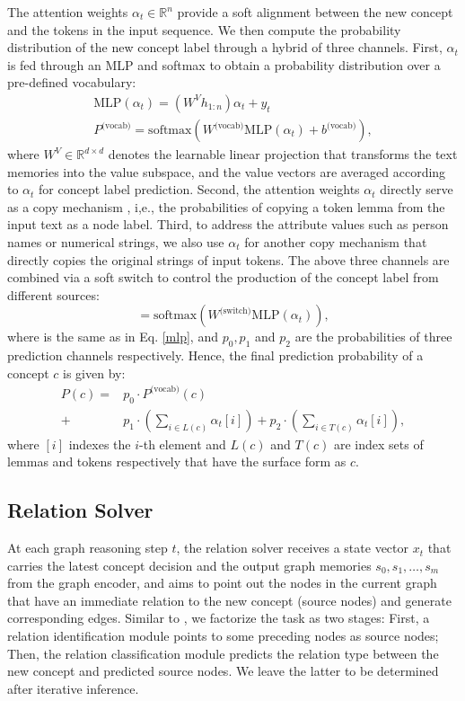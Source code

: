 \documentclass[11pt,a4paper]{article}
\begin{document}
	The attention weights $\alpha_t\in \mathbb{R}^n$ provide a soft alignment between the new concept and the tokens in the input sequence. We then compute the probability distribution of the new concept label through a hybrid of three channels.
	First, $\alpha_t$ is fed through an MLP and softmax to obtain a probability distribution over a pre-defined vocabulary:
	\begin{gather}
	\text{MLP}(\alpha_t) = (W^{V}h_{1:n}) \alpha_t  + y_t  \label{mlp} \\
	P^{\text{(vocab)}} = \text{softmax}( W^{\text{(vocab)}}\text{MLP}(\alpha_t) + b^{\text{(vocab)}}), \nonumber
	\end{gather}
	where $W^{V}\in \mathbb{R}^{d \times d}$ denotes the learnable linear projection that transforms the text memories into the value subspace, and the value vectors are averaged according to $\alpha_t$ for concept label prediction. Second, the attention weights $\alpha_t$ directly serve as a copy mechanism \cite{gu2016incorporating,see-etal-2017-get}, i,e., the probabilities of copying a token lemma from the input text as a node label. Third, to address the attribute values such as person names or numerical strings, we also use $\alpha_t$ for another copy mechanism that directly copies the original strings of input tokens. The above three channels are combined via a soft switch to control the production of the concept label from different sources:
	\begin{equation}
	[p_{0}, p_{1}, p_{2}] = \text{softmax}( W^{\text{(switch)}}\text{MLP}(\alpha_t)),
	\nonumber
	\end{equation}
	where  is the same as in Eq. \ref{mlp}, and $p_{0}, p_{1}$ and $p_{2}$ are the probabilities of three prediction channels respectively.
	Hence, the final prediction probability of a concept $c$ is given by:
	\begin{align*}
	P(c) = &p_{0} \cdot P^{\text{(vocab)}}(c) \\ 
	+ & p_1  \cdot (\sum_{i \in L(c)}\alpha_t[i]) + p_2 \cdot(\sum_{i \in T(c) }\alpha_t[i]),
	\end{align*} 
	where $[i]$ indexes the $i$-th element and $L(c)$ and $T(c)$ are index sets of lemmas and tokens respectively that have the surface
	form as $c$.
	\subsection{Relation Solver}
	At each graph reasoning step $t$, the relation solver receives a state vector $x_t$ that carries the latest concept decision and the output graph memories $s_0, s_1, \ldots, s_m$ from the graph encoder, and aims to point out the nodes in the current graph that have an immediate relation to the new concept (source nodes) and generate corresponding edges. Similar to , we factorize the task as two stages: First, a relation identification module points to some preceding nodes as source nodes; Then, the relation classification module predicts the relation type between the new concept and predicted source nodes. We leave the latter to be determined after iterative inference.
	
\end{document}
